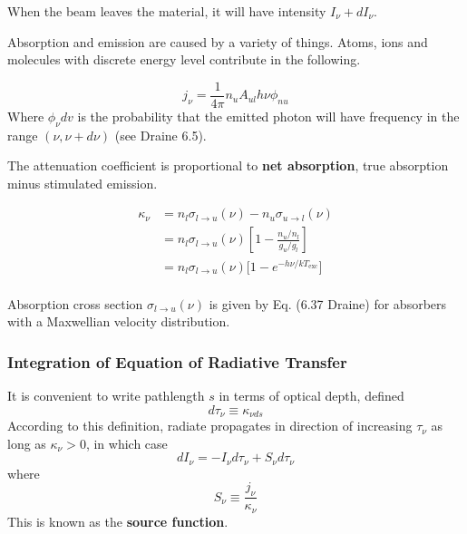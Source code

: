 When the beam leaves the material, it will have intensity $ I_{\nu} + dI_{\nu} $.

Absorption and emission are caused by a variety of things. Atoms, ions and molecules with discrete energy level contribute in the following.

\begin{equation}
  j_{\nu}=\frac{1}{4\pi}n_{u}A_{ul}h\nu\phi_{nu}
\end{equation}
Where $ \phi_{\nu}dv $ is the probability that the emitted photon will have frequency in the range $ (\nu,\nu+d\nu) $ (see Draine 6.5). 

The attenuation coefficient is proportional to \textbf{net absorption}, true absorption minus stimulated emission.

\begin{equation}
  \begin{split}
    \kappa_{\nu}&=n_{l}\sigma_{l\to u}(\nu)-n_{u}\sigma_{u\to l}(\nu)\\
                &=n_{l}\sigma_{l\to u}(\nu)[1-\frac{n_{u}/n_{l}}{g_{u}/g_{l}}]\\
                &=n_{l}\sigma_{l\to u}(\nu)\big[1-e^{-h\nu/kT_{\text{exc}}}\big]\\
  \end{split}
\end{equation}

Absorption cross section $ \sigma_{l\to u}(\nu) $ is given by Eq. (6.37 Draine) for absorbers with a Maxwellian velocity distribution.

\subsubsection{Integration of Equation of Radiative Transfer}
It is convenient to write pathlength $ s $ in terms of optical depth, defined
\begin{equation}
  d\tau_{\nu}\equiv\kappa_{\nu ds}
\end{equation}
According to this definition, radiate propagates in direction of increasing $ \tau_{\nu} $ as long as $ \kappa_{\nu} > 0$, in which case
\begin{equation}
  \label{radiative_transfer_no_scattering}
  dI_{\nu}=-I_{\nu}d\tau_{\nu}+S_{\nu}d\tau_{\nu}
\end{equation}
where
\begin{equation}
  S_{\nu}\equiv \frac{j_{\nu}}{\kappa_{\nu}}
\end{equation}
This is known as the \textbf{source function}. 

